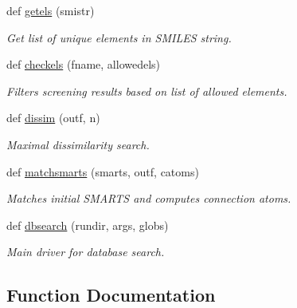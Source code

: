 \begin{DoxyCompactItemize}
def \hyperlink{namespacemolSimplify_1_1Scripts_1_1dbinteract_a27650a76a840ae1929e789e6e8a0c36a}{getels} (smistr)
\begin{DoxyCompactList}\small\item\em Get list of unique elements in S\+M\+I\+L\+ES string. \end{DoxyCompactList}\item 
def \hyperlink{namespacemolSimplify_1_1Scripts_1_1dbinteract_aa430c983537352397787b7e0f0bfe822}{checkels} (fname, allowedels)
\begin{DoxyCompactList}\small\item\em Filters screening results based on list of allowed elements. \end{DoxyCompactList}\item 
def \hyperlink{namespacemolSimplify_1_1Scripts_1_1dbinteract_ad7cec45df1ee9f3e74f2959ca6c5b1e2}{dissim} (outf, n)
\begin{DoxyCompactList}\small\item\em Maximal dissimilarity search. \end{DoxyCompactList}\item 
def \hyperlink{namespacemolSimplify_1_1Scripts_1_1dbinteract_ad591694d6621ccf8a487ccbb155dc3d2}{matchsmarts} (smarts, outf, catoms)
\begin{DoxyCompactList}\small\item\em Matches initial S\+M\+A\+R\+TS and computes connection atoms. \end{DoxyCompactList}\item 
def \hyperlink{namespacemolSimplify_1_1Scripts_1_1dbinteract_a4ff17f8e5ab72528618b47331a975143}{dbsearch} (rundir, args, globs)
\begin{DoxyCompactList}\small\item\em Main driver for database search. \end{DoxyCompactList}\end{DoxyCompactItemize}


\subsection{Function Documentation}
\mbox{\label{namespacemolSimplify_1_1Scripts_1_1dbinteract_aa430c983537352397787b7e0f0bfe822}} 
